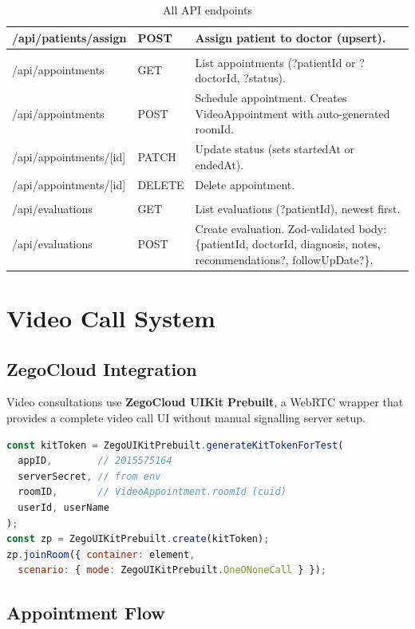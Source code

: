 \documentclass[12pt,a4paper]{report}
\begin{document}
\begin{table}[H]
\begin{tabularx}{\linewidth}{>{\ttfamily\small}l >{\small}l X}
/api/patients/assign & POST & Assign patient to doctor (upsert). \\
\midrule
\multicolumn{3}{l}{\textbf{Appointments}} \\
/api/appointments & GET & List appointments (?patientId or ?doctorId, ?status). \\
/api/appointments & POST & Schedule appointment. Creates VideoAppointment with auto-generated roomId. \\
/api/appointments/[id] & PATCH & Update status (sets startedAt or endedAt). \\
/api/appointments/[id] & DELETE & Delete appointment. \\
\midrule
\multicolumn{3}{l}{\textbf{Evaluations}} \\
/api/evaluations & GET & List evaluations (?patientId), newest first. \\
/api/evaluations & POST & Create evaluation. Zod-validated body: \{patientId, doctorId, diagnosis, notes, recommendations?, followUpDate?\}. \\
\bottomrule
\end{tabularx}
\caption{All API endpoints}
\end{table}

\chapter{Video Call System}

\section{ZegoCloud Integration}

Video consultations use \textbf{ZegoCloud UIKit Prebuilt}, a WebRTC wrapper that provides a complete video call UI without manual signalling server setup.

\begin{lstlisting}[language=JavaScript,caption={ZegoCloud room join pattern (from ZEGO.md)}]
const kitToken = ZegoUIKitPrebuilt.generateKitTokenForTest(
  appID,        // 2015575164
  serverSecret, // from env
  roomID,       // VideoAppointment.roomId (cuid)
  userId, userName
);
const zp = ZegoUIKitPrebuilt.create(kitToken);
zp.joinRoom({ container: element,
  scenario: { mode: ZegoUIKitPrebuilt.OneONoneCall } });
\end{lstlisting}

\section{Appointment Flow}
\end{document}
